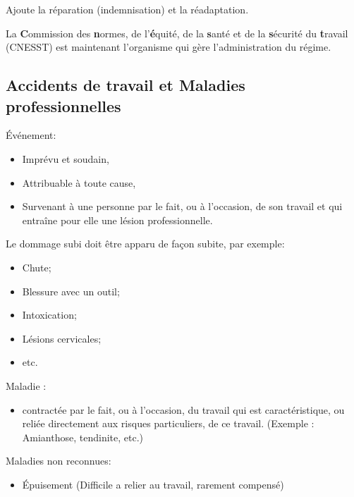 \documentclass[10pt, french]{article}
\begin{document}
\begin{multicols*}{3}
\begin{rappel_enhanced}
Ajoute la réparation (indemnisation) et la réadaptation.
\end{rappel_enhanced}

La \textbf{C}ommission des \textbf{n}ormes, de l'\textbf{é}quité, de la \textbf{s}anté et de la \textbf{s}écurité du \textbf{t}ravail (CNESST) est maintenant l'organisme qui gère l'administration du régime.

\subsection*{Accidents de travail et Maladies professionnelles}
\begin{definitionNOHFILL}
Événement: 
\begin{itemize}[leftmargin = *]
	\item	Imprévu et soudain, 
	\item	Attribuable à toute cause, 
	\item	Survenant à une personne par le fait, ou à l'occasion, de son travail et qui entraîne pour elle une lésion professionnelle.
\end{itemize}

Le dommage subi doit être apparu de façon subite, par exemple: 
\begin{itemize}[leftmargin = *]
	\item	Chute;
	\item	Blessure avec un outil;
	\item	Intoxication;
	\item	Lésions cervicales;
	\item    etc.
\end{itemize}
\end{definitionNOHFILL}

\begin{definitionNOHFILL}
Maladie :
\begin{itemize}[leftmargin = *]
	\item	contractée par le fait, ou à l'occasion, du travail qui est caractéristique, ou reliée directement aux risques particuliers, de ce travail. (Exemple : Amianthose, tendinite, etc.)
\end{itemize}

Maladies non reconnues:
\begin{itemize}[leftmargin = *]
	\item	Épuisement (Difficile a relier au travail, rarement compensé)
\end{itemize}
\end{definitionNOHFILL}


\end{multicols*}
\end{document}
